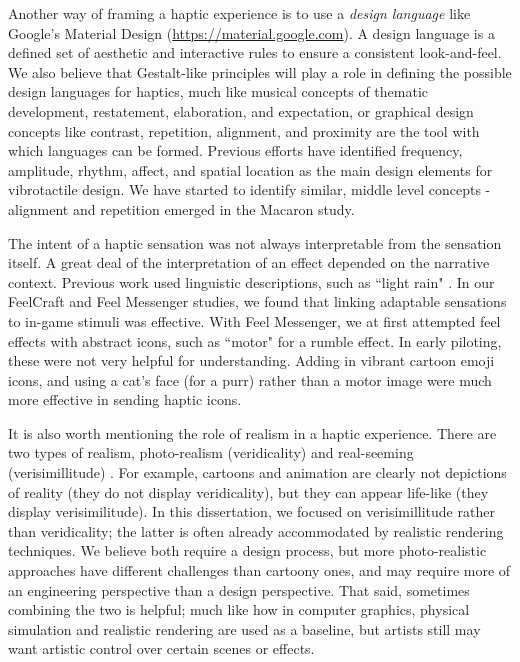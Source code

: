 Another way of framing a haptic experience is to use a \emph{design language} like Google's Material Design (\url{https://material.google.com}).
A design language is a defined set of aesthetic and interactive rules to ensure a consistent look-and-feel.
We also believe that Gestalt-like principles will play a role in defining the possible design languages for haptics,
much like musical concepts of thematic development, restatement, elaboration, and expectation, or graphical design concepts like contrast, repetition, alignment, and proximity are the tool with which languages can be formed.
Previous efforts have identified frequency, amplitude, rhythm, affect, and spatial location as the main design elements for vibrotactile design.
We have started to identify similar, middle level concepts - alignment and repetition emerged in the Macaron study.


The intent of a haptic sensation was not always interpretable from the sensation itself.
A great deal of the interpretation of an effect depended on the narrative context.
Previous work used linguistic descriptions, such as ``light rain" \cite{Israr2014}.
In our FeelCraft and Feel Messenger studies, we found that linking adaptable sensations to in-game stimuli was effective.
With Feel Messenger, we at first attempted feel effects with abstract icons, such as ``motor" for a rumble effect. 
In early piloting, these were not very helpful for understanding.
Adding in vibrant cartoon emoji icons, and using  a cat's face (for a purr) rather than a motor image were much more effective in sending haptic icons.

It is also worth mentioning the role of realism in a haptic experience.
There are two types of realism, photo-realism (veridicality) and real-seeming (verisimillitude) \cite{mccloud1993understanding}.
For example, cartoons and animation are clearly not depictions of reality (they do not display veridicality), but they can appear life-like (they display verisimilitude).
In this dissertation, we focused on verisimillitude rather than veridicality; the latter is often already accommodated by realistic rendering techniques.
We believe both require a design process, but more photo-realistic approaches have different challenges than cartoony ones, and may require more of an engineering perspective than a design perspective.
That said, sometimes combining the two is helpful; much like how in computer graphics, physical simulation and realistic rendering are used as a baseline, but artists still may want artistic control over certain scenes or effects.





